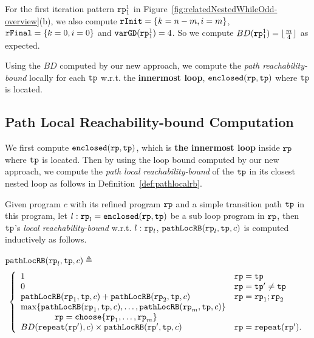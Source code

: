 For the first iteration pattern $\mathtt{rp}_1^1$ in Figure~\ref{fig:relatedNestedWhileOdd-overview}(b), we also compute 
$\mathtt{rInit} = \{k = n - m, i = m\}$, $\mathtt{rFinal} = \{k = 0, i = 0\}$ and $\mathtt{varGD}(\mathtt{rp}_1^1) = 4$. So we compute $BD(\mathtt{rp}_1^1) = \lfloor \frac{m}{4} \rfloor $ as expected.

Using the $BD$ computed by our new approach, we compute the \emph{path reachability-bound} locally for
each $\mathtt{tp}$ w.r.t. the \textbf{innermost loop}, $\mathtt{enclosed}(\mathtt{rp}, \mathtt{tp})$ where $\mathtt{tp}$ is located.

\subsection{Path Local Reachability-bound Computation}
We first compute $\mathtt{enclosed}(\mathtt{rp}, \mathtt{tp})$, which is \textbf{the innermost loop} inside $\mathtt{rp}$ where $\mathtt{tp}$ is located. Then by using the loop bound computed by our new approach, we compute the \emph{path local reachability-bound} of
the $\mathtt{tp}$ in its closest nested loop as follows in Definition~\ref{def:pathlocalrb}.
\begin{defn}
    \label{def:pathlocalrb}
    Given program $c$ with its refined program $\mathtt{rp}$ and a simple transition path $\mathtt{tp}$ in this program, 
    let $l: \mathtt{rp}_l = \mathtt{enclosed}(\mathtt{rp}, \mathtt{tp})$ be a sub loop program in $\mathtt{rp}$,
    then $\mathtt{tp}$'s \emph{local reachability-bound} w.r.t. $l: \mathtt{rp}_l$,
    $\mathtt{pathLocRB}(\mathtt{rp}_l, \mathtt{tp}, c)$
    is computed inductively as follows.

    $\mathtt{pathLocRB}(\mathtt{rp}_l, \mathtt{tp}, c) \triangleq$
    \[ 
      \left\{
    \begin{array}{ll}
       1  & \rprog = \tpath\\
      \highlight{0} & \rprog = \tpath' \neq \tpath\\
      \outinB(\rprog_1, \tpath, c) + \outinB(\rprog_2, \tpath, c) & \rprog = \rprog_1;\rprog_2 \\
      \max\left\{ \outinB(\rprog_1, \tpath, c), \ldots, \outinB(\rprog_m, \tpath, c) \right\} 
      & \\
      \qquad \qquad \rprog = \rpchoose{\rprog_1, \ldots, \rprog_m } & \\
      BD(\rprepeat(\rprog'), c) \times \outinB(\rprog', \tpath, c) & \rprog = \rprepeat(\rprog').
    \end{array}
    \right.
    \]
\end{defn}
